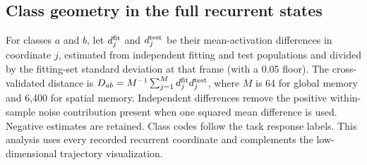 \documentclass[11pt]{article}
\begin{document}
\subsection{Class geometry in the full recurrent states}
For classes $a$ and $b$, let $d^{\rm fit}_j$ and $d^{\rm test}_j$ be their mean-activation differences in coordinate $j$, estimated from independent fitting and test populations and divided by the fitting-set standard deviation at that frame (with a 0.05 floor). The cross-validated distance is $D_{ab}=M^{-1}\sum_{j=1}^{M}d^{\rm fit}_j d^{\rm test}_j$, where $M$ is 64 for global memory and 6,400 for spatial memory. Independent differences remove the positive within-sample noise contribution present when one squared mean difference is used. Negative estimates are retained. Class codes follow the task response labels. This analysis uses every recorded recurrent coordinate and complements the low-dimensional trajectory visualization.
\end{document}
